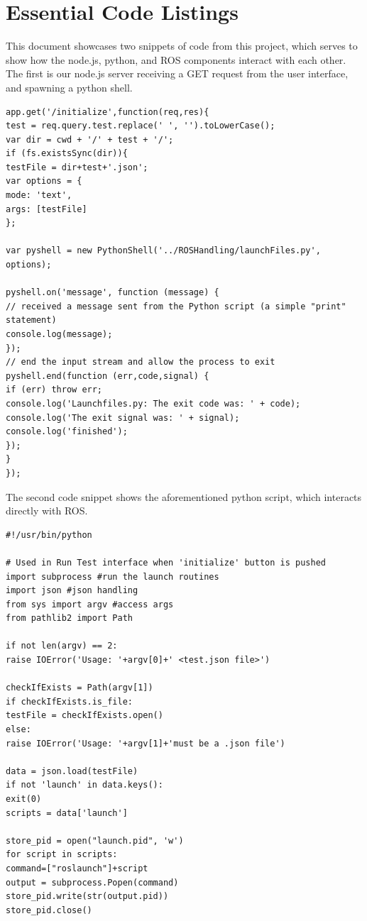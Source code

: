 \documentclass[onecolumn, draftclsnofoot,10pt, compsoc]{report}
\begin{document}
\appendix
\chapter{Essential Code Listings}
\minitoc
This document showcases two snippets of code from this project, which serves to show how the node.js, python, and ROS components interact with each other.
\\
The first is our node.js server receiving a GET request from the user interface, and spawning a python shell.\\
\begin{verbatim}
app.get('/initialize',function(req,res){
test = req.query.test.replace(' ', '').toLowerCase();
var dir = cwd + '/' + test + '/';
if (fs.existsSync(dir)){
testFile = dir+test+'.json';
var options = {
mode: 'text',
args: [testFile]
};

var pyshell = new PythonShell('../ROSHandling/launchFiles.py', options);

pyshell.on('message', function (message) {
// received a message sent from the Python script (a simple "print" statement)
console.log(message);
});
// end the input stream and allow the process to exit
pyshell.end(function (err,code,signal) {
if (err) throw err;
console.log('Launchfiles.py: The exit code was: ' + code);
console.log('The exit signal was: ' + signal);
console.log('finished');
});
}
});
\end{verbatim}
The second code snippet shows the aforementioned python script, which interacts directly with ROS.
\begin{verbatim}
#!/usr/bin/python

# Used in Run Test interface when 'initialize' button is pushed
import subprocess #run the launch routines
import json #json handling
from sys import argv #access args
from pathlib2 import Path

if not len(argv) == 2:
raise IOError('Usage: '+argv[0]+' <test.json file>')

checkIfExists = Path(argv[1])
if checkIfExists.is_file:
testFile = checkIfExists.open()
else:
raise IOError('Usage: '+argv[1]+'must be a .json file')	

data = json.load(testFile)
if not 'launch' in data.keys():
exit(0)
scripts = data['launch']

store_pid = open("launch.pid", 'w')
for script in scripts:
command=["roslaunch"]+script
output = subprocess.Popen(command) 
store_pid.write(str(output.pid))
store_pid.close()
\end{verbatim}
\end{document}
